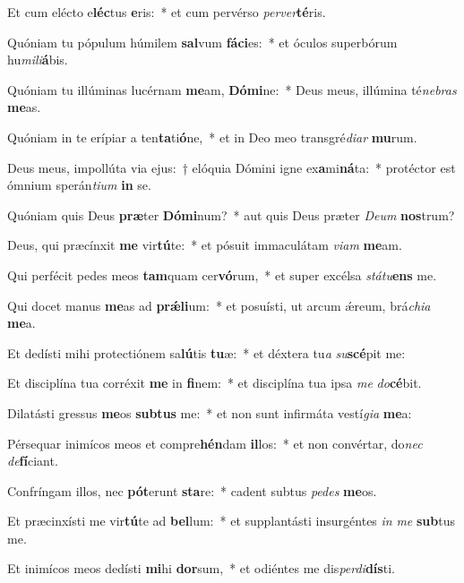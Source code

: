 \item Et cum elécto e\textbf{léc}tus \textbf{e}ris:~* et cum pervérso \textit{per}\textit{ver}\textbf{té}ris.
\item Quóniam tu pópulum húmilem \textbf{sal}vum \textbf{fá}\textbf{ci}es:~* et óculos superbórum hu\textit{mi}\textit{li}\textbf{á}bis.
\item Quóniam tu illúminas lucérnam \textbf{me}am, \textbf{Dó}\textbf{mi}ne:~* Deus meus, illúmina té\textit{ne}\textit{bras} \textbf{me}as.
\item Quóniam in te erípiar a ten\textbf{ta}ti\textbf{ó}ne,~* et in Deo meo transgré\textit{di}\textit{ar} \textbf{mu}rum.
\item Deus meus, impollúta via ejus:~† elóquia Dómini igne ex\textbf{a}mi\textbf{ná}ta:~* protéctor est ómnium sperán\textit{ti}\textit{um} \textbf{in} se.
\item Quóniam quis Deus \textbf{præ}ter \textbf{Dó}\textbf{mi}num?~* aut quis Deus præter \textit{De}\textit{um} \textbf{nos}trum?
\item Deus, qui præcínxit \textbf{me} vir\textbf{tú}te:~* et pósuit immaculátam \textit{vi}\textit{am} \textbf{me}am.
\item Qui perfécit pedes meos \textbf{tam}quam cer\textbf{vó}rum,~* et super excélsa \textit{stá}\textit{tu}\textbf{ens} me.
\item Qui docet manus \textbf{me}as ad \textbf{prǽ}\textbf{li}um:~* et posuísti, ut arcum ǽreum, brá\textit{chi}\textit{a} \textbf{me}a.
\item Et dedísti mihi protectiónem sa\textbf{lú}tis \textbf{tu}æ:~* et déxtera tu\textit{a} \textit{su}\textbf{scé}pit me:
\item Et disciplína tua corréxit \textbf{me} in \textbf{fi}nem:~* et disciplína tua ipsa \textit{me} \textit{do}\textbf{cé}bit.
\item Dilatásti gressus \textbf{me}os \textbf{sub}\textbf{tus} me:~* et non sunt infirmáta vestí\textit{gi}\textit{a} \textbf{me}a:
\item Pérsequar inimícos meos et compre\textbf{hén}dam \textbf{il}los:~* et non convértar, do\textit{nec} \textit{de}\textbf{fí}ciant.
\item Confríngam illos, nec \textbf{pót}erunt \textbf{sta}re:~* cadent subtus \textit{pe}\textit{des} \textbf{me}os.
\item Et præcinxísti me vir\textbf{tú}te ad \textbf{bel}lum:~* et supplantásti insurgéntes \textit{in} \textit{me} \textbf{sub}tus me.
\item Et inimícos meos dedísti \textbf{mi}hi \textbf{dor}sum,~* et odiéntes me dis\textit{per}\textit{di}\textbf{dís}ti.
